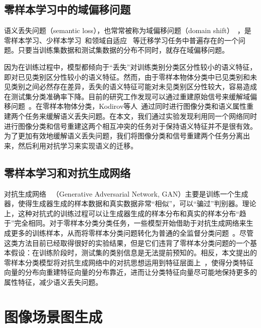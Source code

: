 \subsection{零样本学习中的域偏移问题}
语义丢失问题（semantic loss），也常常被称为域偏移问题（domain shift）~\cite{fu2015transductive,saenko2010adapting}，是零样本学习、少样本学习~\cite{hariharan2017low}和领域自适应~\cite{motiian2017unified,panareda2017open}
等迁移学习任务中普遍存在的一个问题。只要当训练集数据和测试集数据的分布不同时，就存在域偏移问题。

因为在训练过程中，模型都倾向于“丢失”对训练类别分类区分性较小的语义特征，即对已见类别区分性较小的语义特征。然而，由于零样本物体分类中已见类别和未见类别之间必然存在差异，丢失的语义特征可能对未见类别区分性较大，容易造成在测试集分类准确率下降。目前的研究工作发现可以通过重建原始信号来缓解域偏移问题~\cite{kim2017learning}。在零样本物体分类，Kodirov等人~\cite{kodirov2017semantic}通过同时进行图像分类和语义属性重建两个任务来缓解语义丢失问题。在本文，我们通过实验发现利用同一个网络同时进行图像分类和信号重建这两个相互冲突的任务对于保持语义特征并不是很有效。为了更加有效地缓解语义丢失问题，我们将图像分类和信号重建两个任务分离出来，然后利用对抗学习来实现语义的迁移。

\subsection{零样本学习和对抗生成网络}
对抗生成网络~\cite{goodfellow2014generative} （Generative Adversarial Network, GAN）主要是训练一个生成器，使得生成器生成的样本数据和真实数据非常“相似”，可以“骗过”判别器。理论上，这种对抗式的训练过程可以让生成器生成的样本分布和真实的样本分布“趋于”完全相同。对于零样本分类分类任务，一些模型开始借助于对抗生成网络来生成更多的训练样本，从而将零样本分类问题转化为普通的全监督分类问题~\cite{mishra2018generative,xian2018feature,xian2019f}。尽管这类方法目前已经取得很好的实验结果，但是它们违背了零样本分类问题的一个基本假设：在训练阶段时，测试集的类别信息是无法提前预知的。相反，本文提出的零样本分类模型将对抗生成网络中的对抗思想运用到特征层面上~\cite{odena2017conditional,tzeng2017adversarial,makhzani2015adversarial,shrivastava2017learning}，使得分类特征向量的分布向重建特征向量的分布靠近，进而让分类特征向量尽可能地保持更多的属性特征，减少语义丢失问题。


\section{图像场景图生成}

